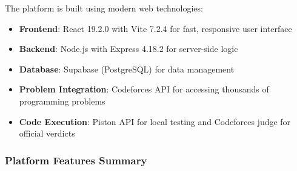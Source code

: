 \documentclass[12pt]{article}
\begin{document}
The platform is built using modern web technologies:
\begin{itemize}
\item \textbf{Frontend}: React 19.2.0 with Vite 7.2.4 for fast, responsive user interface
\item \textbf{Backend}: Node.js with Express 4.18.2 for server-side logic
\item \textbf{Database}: Supabase (PostgreSQL) for data management
\item \textbf{Problem Integration}: Codeforces API for accessing thousands of programming problems
\item \textbf{Code Execution}: Piston API for local testing and Codeforces judge for official verdicts
\end{itemize}

\subsubsection{Platform Features Summary}
\end{document}
